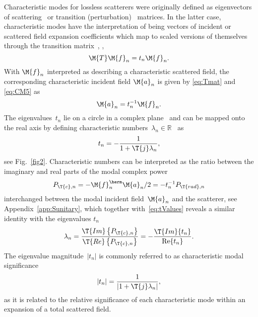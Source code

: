 \documentclass[journal]{IEEEtran}
\begin{document}
Characteristic modes for lossless scatterers were originally defined as eigenvectors of scattering~\cite[Chap.~9]{1948_Montgomery_Principles_of_Microwave_Circuits} or transition (perturbation)~\cite{Garbacz_TCMdissertation} matrices.  In the latter case, characteristic modes have the interpretation of being vectors of incident or scattered field expansion coefficients which map to scaled versions of themselves through the transition matrix~\cite{Garbacz_TCMdissertation}, \ie{},
\begin{equation}
   \label{eq:CM5}
   \M{T}  \M{f}_{n} = t_n \M{f}_{n}.
\end{equation}
With $\M{f}_n$ interpreted as describing a characteristic scattered field, the corresponding characteristic incident field $\M{a}_n$ is given by \eqref{eq:Tmat} and \eqref{eq:CM5} as
\begin{equation}
    \label{eq:anToFn}
    \M{a}_n = t_n^{-1}\M{f}_n. 
\end{equation}
The eigenvalues~$t_n$ lie on a circle in a complex plane~\cite[Chap.~7]{Kristensson_ScatteringBook} and can be mapped onto the real axis by defining characteristic numbers~$\lambda_n \in \mathbb{R}$~\cite{GarbaczTurpin_AGeneralizedExpansionForRadiatedAndScatteredFields,HarringtonMautz_TheoryOfCharacteristicModesForConductingBodies} as
\begin{equation}
\label{eq:tValues}
  t_n = -\frac{1}{1 + \T{j}\lambda_n},
\end{equation}
see Fig.~\ref{fig2}. 
Characteristic numbers can be interpreted as the ratio between the imaginary and real parts of the modal complex power
\begin{equation}
P_{\T{c},n} = - \M{f}_n^\herm \M{a}_n / 2 = - t_n^{-1} P_{\T{rad},n}
\label{eq:Pc}
\end{equation}
interchanged between the modal incident field~$\M{a}_n$ and the scatterer, see Appendix~\ref{app:Sunitary}, which together with~\eqref{eq:tValues} reveals a similar identity with the eigenvalues $t_n$
\begin{equation}
	\lambda_n	=\dfrac{\T{Im} \left\{ P_{\T{c},n} \right\}}{\T{Re} \left\{ P_{\T{c},n}\right\}} = -\dfrac{\T{Im}\{t_n\}}{\Re\{t_n\}}.
\label{eq:t2la}
\end{equation} 
The eigenvalue magnitude~$|t_n|$ is commonly referred to as characteristic modal significance \cite{Austin_1998_TCM_NVIS}
\begin{equation}
   \label{eq:CM6}
  \lvert t_n\rvert= \frac{1}{\lvert 1 + \T{j}\lambda_n\rvert},
\end{equation}
as it is related to the relative significance of each characteristic mode within an expansion of a total scattered field. 
\end{document}
